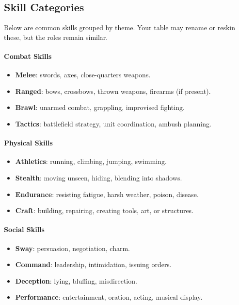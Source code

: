 \subsection{Skill Categories}
\label{sec:skill-categories}
Below are common skills grouped by theme. Your table may rename or reskin
these, but the roles remain similar.

\paragraph{Combat Skills}
\begin{itemize}
  \item \textbf{Melee}: swords, axes, close-quarters weapons.
  \item \textbf{Ranged}: bows, crossbows, thrown weapons, firearms (if present).
  \item \textbf{Brawl}: unarmed combat, grappling, improvised fighting.
  \item \textbf{Tactics}: battlefield strategy, unit coordination, ambush planning.
\end{itemize}

\paragraph{Physical Skills}
\begin{itemize}
  \item \textbf{Athletics}: running, climbing, jumping, swimming.
  \item \textbf{Stealth}: moving unseen, hiding, blending into shadows.
  \item \textbf{Endurance}: resisting fatigue, harsh weather, poison, disease.
  \item \textbf{Craft}: building, repairing, creating tools, art, or structures.
\end{itemize}

\paragraph{Social Skills}
\begin{itemize}
  \item \textbf{Sway}: persuasion, negotiation, charm.
  \item \textbf{Command}: leadership, intimidation, issuing orders.
  \item \textbf{Deception}: lying, bluffing, misdirection.
  \item \textbf{Performance}: entertainment, oration, acting, musical display.
\end{itemize}

